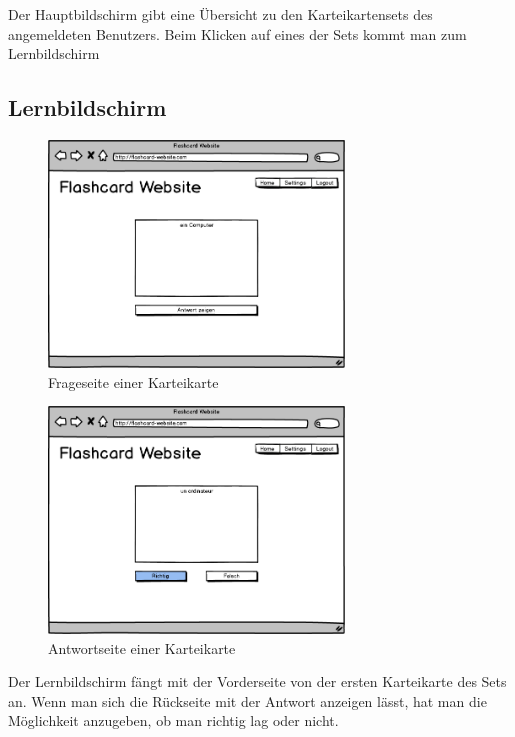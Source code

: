 Der Hauptbildschirm gibt eine Übersicht zu den Karteikartensets des angemeldeten Benutzers. Beim Klicken auf eines der Sets kommt man zum Lernbildschirm


\subsection{Lernbildschirm}


\begin{figure}[H]
    \centering
    \includegraphics[width=0.7\textwidth]{images/Lernscreen-Frage.png}
    \caption{Frageseite einer Karteikarte}
    \label{fig:lernscreen-frage}
\end{figure}

\begin{figure}[H]
    \centering
    \includegraphics[width=0.7\textwidth]{images/Lernscreen-Antwort.png}
    \caption{Antwortseite einer Karteikarte}
    \label{fig:lernscreen-antwort}
\end{figure}

Der Lernbildschirm fängt mit der Vorderseite von der ersten Karteikarte des Sets an. Wenn man sich die Rückseite mit der Antwort anzeigen lässt, hat man die Möglichkeit anzugeben, ob man richtig lag oder nicht.

